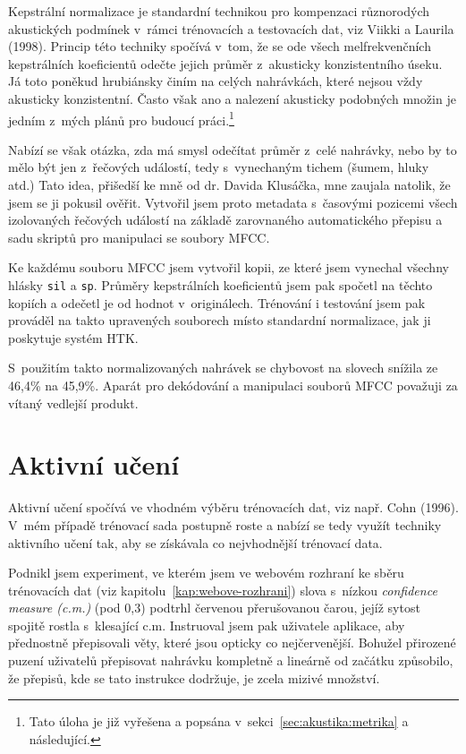Kepstrální normalizace je standardní technikou pro kompenzaci různorodých
akustických podmínek v~rámci trénovacích a testovacích dat, viz Viikki a Laurila
(1998)\cite{viikki1998cepstral}. Princip této techniky spočívá v~tom, že se ode
všech melfrekvenčních kepstrálních koeficientů odečte jejich průměr z~akusticky
konzistentního úseku. Já toto poněkud hrubiánsky činím na celých nahrávkách,
které nejsou vždy akusticky konzistentní. Často však ano a nalezení akusticky
podobných množin je jedním z~mých plánů pro budoucí práci.\footnote{Tato úloha
je již vyřešena a popsána v~sekci~\ref{sec:akustika:metrika} a následující.}

Nabízí se však otázka, zda má smysl odečítat průměr z~celé nahrávky, nebo by to
mělo být jen z~řečových událostí, tedy s~vynechaným tichem (šumem, hluky atd.)
Tato idea, přišedší ke mně od dr. Davida Klusáčka, mne zaujala natolik, že jsem se
ji pokusil ověřit. Vytvořil jsem proto metadata s~časovými pozicemi všech
izolovaných řečových událostí na základě zarovnaného automatického přepisu a sadu skriptů
pro manipulaci se soubory MFCC.

Ke každému souboru MFCC jsem vytvořil kopii, ze které
jsem vynechal všechny hlásky \texttt{sil} a \texttt{sp}. Průměry kepstrálních
koeficientů jsem pak spočetl na těchto kopiích a odečetl je od hodnot
v~originálech. Trénování i testování jsem pak prováděl na takto upravených
souborech místo standardní normalizace, jak ji poskytuje systém HTK.

S~použitím takto normalizovaných nahrávek se chybovost na slovech snížila ze
46,4\% na 45,9\%.  Aparát pro dekódování
a manipulaci souborů MFCC považuji za vítaný vedlejší produkt.

\section{Aktivní učení}

Aktivní učení spočívá ve vhodném výběru trénovacích dat, viz např. Cohn
(1996)\cite{cohn1996active}. V~mém případě trénovací sada postupně roste a nabízí
se tedy využít techniky aktivního učení tak, aby se získávala co nejvhodnější
trénovací data.

Podnikl jsem experiment, ve kterém jsem ve webovém rozhraní ke sběru trénovacích
dat (viz kapitolu~\ref{kap:webove-rozhrani}) slova s~nízkou {\em confidence
measure (c.m.)} (pod 0,3) podtrhl červenou přerušovanou čarou, jejíž sytost spojitě rostla
s~klesající c.m. Instruoval jsem pak uživatele aplikace, aby přednostně
přepisovali věty, které jsou opticky co nejčervenější. Bohužel přirozené puzení
uživatelů přepisovat nahrávku kompletně a lineárně od začátku způsobilo, že
přepisů, kde se tato instrukce dodržuje, je zcela mizivé množství.

